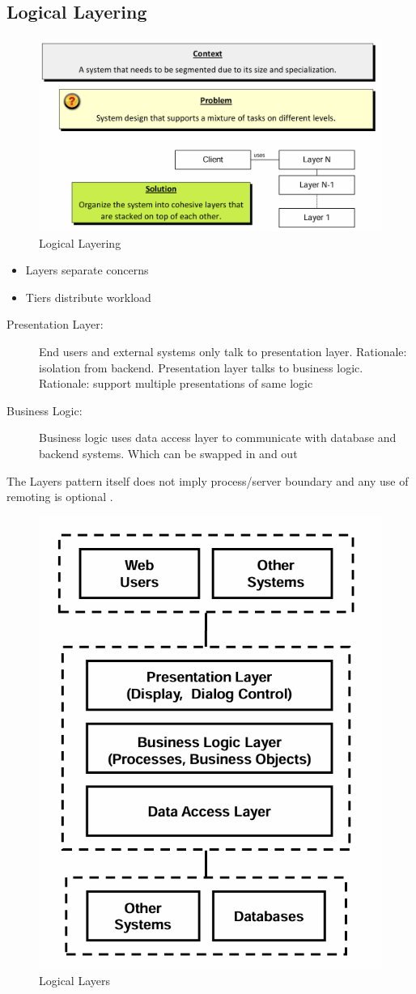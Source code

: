\documentclass[../Main.tex]{subfiles}
\begin{document}
\subsection{Logical Layering}
\begin{figure}[H]
    \centering
    \includegraphics{Images/logicallayering.png}
    \caption{Logical Layering}
    \label{fig:logicallayering}
\end{figure}
\begin{itemize}
    \item Layers separate concerns
    \item Tiers distribute workload
\end{itemize}
\begin{description}
\item[Presentation Layer:] End users and external systems only talk to presentation layer. Rationale: isolation from backend. Presentation layer talks to business logic. Rationale: support multiple presentations of same logic
\item[Business Logic:] Business logic uses data access layer to communicate with database and backend systems. Which can be swapped in and out
\end{description}
The Layers pattern itself does not imply process/server boundary and any use of remoting is optional .
\begin{figure}[H]
    \centering
    \includegraphics[width=0.5\linewidth]{Images/logicallayer.png}
    \caption{Logical Layers}
    \label{fig:logicallayers}
\end{figure}
\end{document}

